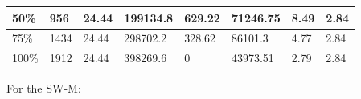 \documentclass[12pt]{UIdahoMastersThesis}
\begin{document}
\begin{table}[h!]
\begin{tabular}{|l|l|l|l|l|l|l|l|}
50\%                                                                                                            &956 &24.44                                                                                                   & 199134.8                                                                                       & 629.22                                                       & 71246.75                                                                             & 8.49               & 2.84                                                               \\ \hline
75\%                                                                                                            &1434 &24.44                                                                                                   & 298702.2                                                                                       & 328.62                                                       & 86101.3                                                                              & 4.77               & 2.84                                                               \\ \hline
100\%                                                                                                           & 1912&24.44                                                                                                   & 398269.6                                                                                       & 0                                                            & 43973.51                                                                             & 2.79               & 2.84                                                               \\ \hline
\end{tabular}
\end{table}

For the SW-M:
\end{document}
